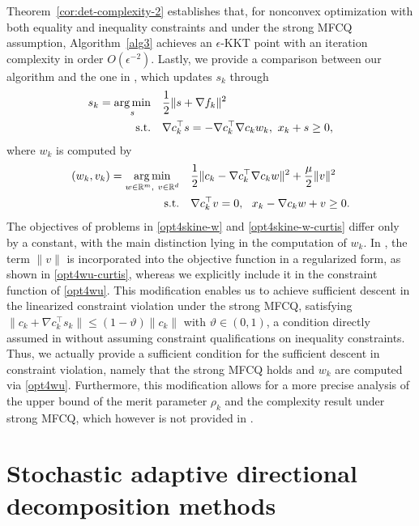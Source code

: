 \documentclass[11pt]{article}
\newcommand{\R}{\mathbb{R}}
\newcommand{\argmin}{\mathop{\mathrm{arg\,min}}}
\newcommand{\be}{\begin{equation}}
\newcommand{\ee}{\end{equation}}
\begin{document}
Theorem~\ref{cor:det-complexity-2} establishes that, for nonconvex  optimization with both equality and inequality constraints and  under the strong MFCQ assumption,  Algorithm~\ref{alg3} achieves an $\epsilon$-KKT point with an iteration  complexity in order $O(\epsilon^{-2})$. %
Lastly, we provide a comparison between our algorithm and  the one in \cite{curtis2024sequential}, which updates \(s_k\) through
\be\label{opt4skine-w-curtis}
\begin{aligned}
    s_k = \argmin_{s}&\quad \frac{1}{2}\|s+\nabla f_k \|^2 \\
    ~{\rm s.t.}& \quad\nabla c_k^\top s  = -\nabla c_k^\top \nabla c_k w_k,~
    x_k + s \geq 0,
\end{aligned}
\ee
where \(w_k\) is computed by 
\be\begin{aligned}\label{opt4wu-curtis}
(w_k,v_k) = \argmin_{w \in \R^m,~v \in \R^d} &\quad \frac{1}{2}\|c_k -\nabla c_k^\top \nabla c_k w\|^2 + \frac{\mu}{2}\|v\|^2\\
{\rm s.t.}&\quad \nabla c_k^\top v = 0,~~x_k - \nabla c_k w + v \geq 0.
\end{aligned}\ee
The objectives of problems in \eqref{opt4skine-w} and \eqref{opt4skine-w-curtis} differ only by a constant, with the main distinction lying in the computation of \(w_k\). In \cite{curtis2024sequential}, the term \(\|v\|\) is incorporated into the objective function in a regularized form, as shown in \eqref{opt4wu-curtis}, whereas we explicitly include it in the constraint function of \eqref{opt4wu}. This modification enables us to achieve sufficient descent in the linearized  constraint violation under the strong MFCQ, satisfying \(\|c_k + \nabla c_k^\top s_k\| \leq (1 - \vartheta) \|c_k\|\) with \(\vartheta \in(0,1)\), a condition directly assumed in \cite{curtis2024sequential} without assuming constraint qualifications on inequality constraints. Thus, we actually provide a sufficient condition for the sufficient descent in constraint violation, namely that the strong MFCQ holds and \(w_k\) are computed via  \eqref{opt4wu}. Furthermore, this modification allows for a more precise analysis of the upper bound of the merit parameter \(\rho_k\) and the complexity result under strong MFCQ, which however is not provided in  \cite{curtis2024sequential}. %

\section{Stochastic adaptive directional decomposition methods}\label{sec:full-sto-method}
\end{document}
